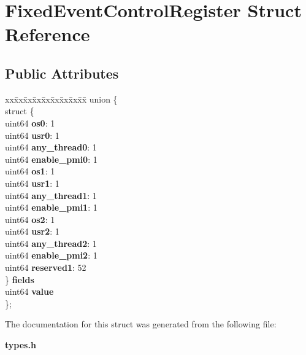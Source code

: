 \section{Fixed\+Event\+Control\+Register Struct Reference}
\label{structFixedEventControlRegister}
\subsection*{Public Attributes}
\begin{DoxyCompactItemize}
\item 
\begin{tabbing}
xx\=xx\=xx\=xx\=xx\=xx\=xx\=xx\=xx\=\kill
union \{\\
\>struct \{\\
\>\>uint64 {\bfseries os0}: 1\\
\>\>uint64 {\bfseries usr0}: 1\\
\>\>uint64 {\bfseries any\_thread0}: 1\\
\>\>uint64 {\bfseries enable\_pmi0}: 1\\
\>\>uint64 {\bfseries os1}: 1\\
\>\>uint64 {\bfseries usr1}: 1\\
\>\>uint64 {\bfseries any\_thread1}: 1\\
\>\>uint64 {\bfseries enable\_pmi1}: 1\\
\>\>uint64 {\bfseries os2}: 1\\
\>\>uint64 {\bfseries usr2}: 1\\
\>\>uint64 {\bfseries any\_thread2}: 1\\
\>\>uint64 {\bfseries enable\_pmi2}: 1\\
\>\>uint64 {\bfseries reserved1}: 52\\
\>\} {\bfseries fields}\\
\>uint64 {\bfseries value}\\
\}; \label{structFixedEventControlRegister_a6e47972b5348979e8d53915444b7a150}
\\

\end{tabbing}\end{DoxyCompactItemize}


The documentation for this struct was generated from the following file\+:\begin{DoxyCompactItemize}
\item 
{\bf types.\+h}\end{DoxyCompactItemize}
